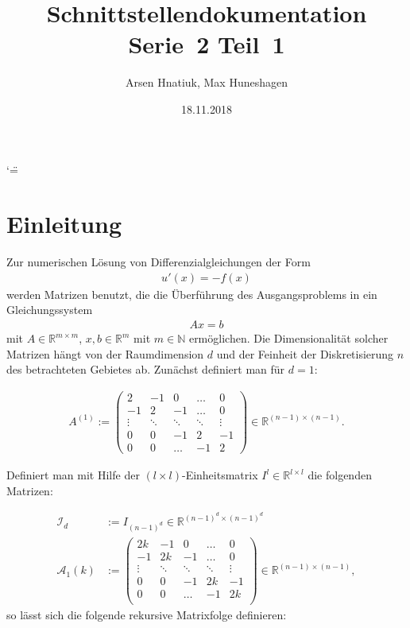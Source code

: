 \documentclass[a4paper,10pt,ngerman, oneside,openright]{sphinxmanual}
\title{Schnittstellendokumentation Serie~2 Teil~1}
\date{18.11.2018}
\author{Arsen Hnatiuk, Max Huneshagen}
\begin{document}
\let\cleardoublepage\clearpage
\ifnum\catcode`\"=\active{}\fi
\maketitle
\sphinxtableofcontents
{}\label{\detokenize{index::doc}}


\chapter{Einleitung}

Zur numerischen Lösung von Differenzialgleichungen der Form 
\begin{align}
u'(x)=-f(x)
\label{eq:dgl}
\end{align}
werden Matrizen benutzt, die die Überführung des Ausgangsproblems in ein Gleichungssystem
\begin{align}
Ax=b	
\label{eq:lgs}
\end{align}
mit $A\in\mathbb{R}^{m\times m}$, $x,b\in \mathbb{R}^m$ mit $m\in\mathbb{N}$ ermöglichen. Die Dimensionalität solcher Matrizen hängt von der Raumdimension $d$ und der Feinheit der Diskretisierung $n$ des betrachteten Gebietes ab. Zunächst definiert man für $d=1$:

\begin{align}
A^{(1)}:= 
\begin{pmatrix}
2 & -1 & 0 & \dots & 0\\
-1 & 2 & -1 & \dots & 0\\
\vdots & \ddots & \ddots & \ddots & \vdots\\
0 & 0 & -1 & 2 & -1\\
0 & 0 & \dots & -1 & 2
\end{pmatrix}\in \mathbb{R}^{(n-1)\times(n-1)}.
\label{eq:a_1_def}
\end{align}

Definiert man mit Hilfe der $(l\times l)$-Einheitsmatrix $I^l\in \mathbb{R}^{l\times l}$ die folgenden Matrizen:

\begin{align}
\mathcal{I}_d&:=I_{(n-1)^d}\in\mathbb{R}^{(n-1)^d\times(n-1)^d}\\
\mathcal{A}_1(k)&:=
\begin{pmatrix}
2k & -1 & 0 & \dots & 0\\
-1 & 2k & -1 & \dots & 0\\
\vdots & \ddots & \ddots & \ddots & \vdots \\
0 & 0 & -1 & 2k & -1\\
0 & 0 & \dots & -1 & 2k\\
\end{pmatrix} \in \mathbb{R}^{(n-1)\times(n-1)},
\end{align}
so lässt sich die folgende rekursive Matrixfolge definieren:
\end{document}
